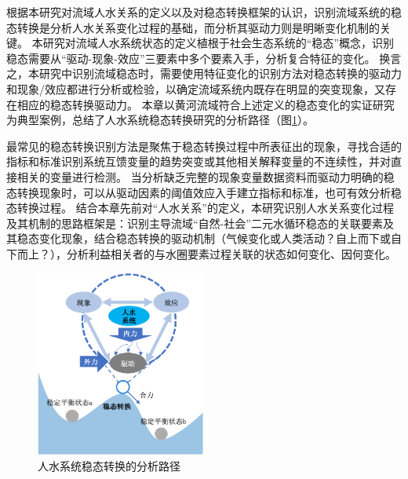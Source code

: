根据本研究对流域人\textendash{}水关系的定义以及对稳态转换框架的认识，识别流域系统的稳态转换是分析人\textendash{}水关系变化过程的基础，而分析其驱动力则是明晰变化机制的关键。
本研究对流域人水系统状态的定义植根于社会\textendash{}生态系统的“稳态”概念，识别稳态需要从“驱动-现象-效应”三要素中多个要素入手，分析复合特征的变化。
换言之，本研究中识别流域稳态时，需要使用特征变化的识别方法对稳态转换的驱动力和现象/效应都进行分析或检验，以确定流域系统内既存在明显的突变现象，又存在相应的稳态转换驱动力。
本章以黄河流域符合上述定义的稳态变化的实证研究为典型案例，总结了人水系统稳态转换研究的分析路径（图\ref{ch2:fig:identifying}）。

最常见的稳态转换识别方法是聚焦于稳态转换过程中所表征出的现象，寻找合适的指标和标准识别系统互馈变量的趋势突变或其他相关解释变量的不连续性，并对直接相关的变量进行检测。
当分析缺乏完整的现象变量数据资料而驱动力明确的稳态转换现象时，可以从驱动因素的阈值效应入手建立指标和标准，也可有效分析稳态转换过程。
结合本章先前对“人\textendash{}水关系”的定义，本研究识别人\textendash{}水关系变化过程及其机制的思路框架是：识别主导流域“自然-社会”二元水循环稳态的关联要素及其稳态变化现象，结合稳态转换的驱动机制（气候变化或人类活动？自上而下或自下而上？），分析利益相关者的与水圈要素过程关联的状态如何变化、因何变化。

\begin{figure}[!ht] %
    \centering
    \includegraphics[width=0.5\textwidth]{img/ch2/ch2_framework.png}
    \caption{人水系统稳态转换的分析路径}\label{ch2:fig:identifying}
\end{figure}
